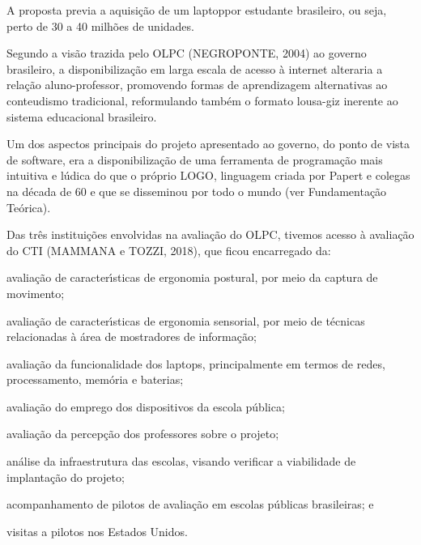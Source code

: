 \documentclass[
12pt,		%
openright,	%
twoside,  %
a4paper,			%
chapter=TITLE,		%
english,			%
french,				%
spanish,			%
brazil				%
]{USPSC-classe/USPSC}
\begin{document}
A proposta previa a aquisi\c{c}\~ao de um \textquotedbl laptop\textquotedbl  por estudante brasileiro, ou seja, perto de 30 a 40 milh\~oes de unidades.









Segundo a vis\~ao trazida pelo OLPC  (NEGROPONTE, 2004) ao governo brasileiro, a disponibiliza\c{c}\~ao em larga escala de acesso \`a internet alteraria a rela\c{c}\~ao aluno-professor, promovendo formas de aprendizagem alternativas ao conteudismo tradicional, reformulando tamb\'em o formato lousa-giz inerente ao sistema educacional brasileiro.









Um dos aspectos principais do projeto apresentado ao governo, do ponto de vista de software, era a disponibiliza\c{c}\~ao de uma ferramenta de programa\c{c}\~ao mais intuitiva e l\'udica do que o pr\'oprio LOGO, linguagem criada por Papert e colegas na d\'ecada de 60 e que se disseminou por todo o mundo (ver Fundamenta\c{c}\~ao Te\'orica).









Das tr\^es institui\c{c}\~oes envolvidas na avalia\c{c}\~ao do OLPC, tivemos acesso \`a avalia\c{c}\~ao do CTI  (MAMMANA e TOZZI, 2018), que ficou encarregado da:










\begin{alineas}
\item avalia\c{c}\~ao de caracter\'{\i}sticas de ergonomia postural, por meio da captura de movimento;
\item avalia\c{c}\~ao de caracter\'{\i}sticas de ergonomia sensorial, por meio de t\'ecnicas relacionadas \`a \'area de mostradores de informa\c{c}\~ao;
\item avalia\c{c}\~ao da funcionalidade dos \textquotedbl laptops\textquotedbl , principalmente em termos de redes, processamento, mem\'oria e baterias;
\item avalia\c{c}\~ao do emprego dos dispositivos  da escola p\'ublica;
\item avalia\c{c}\~ao da percep\c{c}\~ao dos professores sobre o projeto;
\item an\'alise da infraestrutura das escolas, visando verificar a viabilidade de implanta\c{c}\~ao do projeto;
\item acompanhamento de pilotos de avalia\c{c}\~ao em escolas p\'ublicas brasileiras; e
\item visitas a pilotos nos Estados Unidos.
\end{alineas}
\end{document}
